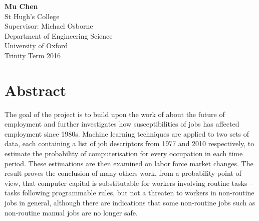 \documentclass[11pt]{report}
\numberwithin{equation}{chapter}
\begin{document}
\begin{titlepage}
 


\Large \textbf{Mu Chen}\\ %
\Large St Hugh's College\\[3cm]

\Large Supervisor: Michael Osborne\\
\Large Department of Engineering Science\\
\Large University of Oxford\\[1cm]


{\large Trinity Term 2016}\\[3cm] %



\vfill %

\end{titlepage}
\newpage


\newpage
\section*{Abstract}
The goal of the project is to build upon the work of \cite{frey2013future} about the future of employment and further investigates how susceptibilities of jobs has affected employment since 1980s.  Machine learning techniques are applied to two sets of data, each containing a list of job descriptors from 1977 and 2010 respectively, to estimate the probability of computerisation for every occupation in each time period. These estimations are then examined on labor force market changes. The result proves the conclusion of many others work\cite{david2001skill}\cite{levy2012new}, from a probability point of view, that computer capital is substitutable for workers involving routine tasks -- tasks following programmable rules, but not a threaten to workers in non-routine jobs in general, although there are indications that some non-routine jobs such as non-routine manual jobs are no longer safe.
\end{document}
